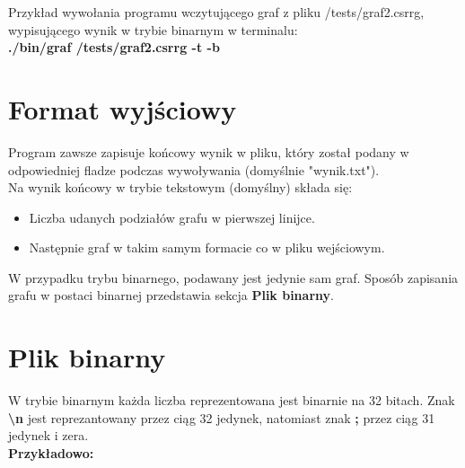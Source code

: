 \documentclass{article}
\begin{document}
Przykład wywołania programu wczytującego graf z pliku /tests/graf2.csrrg, wypisującego wynik w trybie binarnym w terminalu:\\
\textbf{./bin/graf /tests/graf2.csrrg -t -b}

\section*{Format wyjściowy}
Program zawsze zapisuje końcowy wynik w pliku, który został podany w odpowiedniej fladze podczas wywoływania (domyślnie "wynik.txt").\\

Na wynik końcowy w trybie tekstowym (domyślny) składa się:
\begin{itemize}
    \item Liczba udanych podziałów grafu w pierwszej linijce.

    \item Następnie graf w takim samym formacie co w pliku wejściowym.
\end{itemize}

W przypadku trybu binarnego, podawany jest jedynie sam graf. Sposób zapisania grafu w postaci binarnej przedstawia sekcja \textbf{Plik binarny}.

\section*{Plik binarny}
W trybie binarnym każda liczba reprezentowana jest binarnie na 32 bitach. Znak \textbf{\textbackslash n} jest reprezantowany przez ciąg 32 jedynek, natomiast znak \textbf{;} przez ciąg 31 jedynek i zera.\\

\textbf{Przykładowo:}
\end{document}
